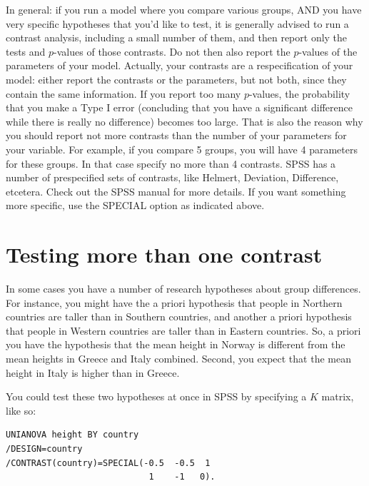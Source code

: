 \documentclass[]{book}\usepackage[]{graphicx}\usepackage[]{color}
\begin{document}
In general: if you run a model where you compare various groups, AND you have very specific hypotheses that you'd like to test, it is generally advised to run a contrast analysis, including a small number of them, and then report only the tests and $p$-values of those contrasts. Do not then also report the $p$-values of the parameters of your model. Actually, your contrasts are a respecification of your model: either report the contrasts or the parameters, but not both, since they contain the same information. If you report too many $p$-values, the probability that you make a Type I error (concluding that you have a significant difference while there is really no difference) becomes too large. That is also the reason why you should report not more contrasts than the number of your parameters for your variable. For example, if you compare 5 groups, you will have 4 parameters for these groups. In that case specify no more than 4 contrasts. SPSS has a number of prespecified sets of contrasts, like Helmert, Deviation, Difference, etcetera. Check out the SPSS manual for more details. If you want something more specific, use the SPECIAL option as indicated above. 


\section{Testing more than one contrast}

In some cases you have a number of research hypotheses about group differences. For instance, you might have the a priori hypothesis that people in Northern countries are taller than in Southern countries, and another a priori hypothesis that people in Western countries are taller than in Eastern countries. So, a priori you have the hypothesis that the mean height in Norway is different from the mean heights in Greece and Italy combined. Second, you expect that the mean height in Italy is higher than in Greece.

You could test these two hypotheses at once in SPSS by specifying a $K$ matrix, like so:

\begin{verbatim}
UNIANOVA height BY country
/DESIGN=country
/CONTRAST(country)=SPECIAL(-0.5  -0.5  1
                            1    -1   0).
\end{verbatim}
\end{document}
